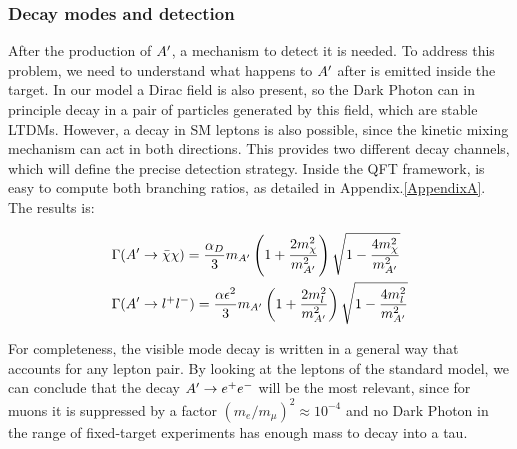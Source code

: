 \subsubsection{Decay modes and detection}
\label{ch1:sec:dm-decay}

After the production of $A'$, a mechanism to detect it is needed. To address this problem, we need to understand what happens to $A'$ after is emitted inside the target. In our model a Dirac field is also present, so the Dark Photon can in principle decay in a pair of particles generated by this field, which are stable LTDMs. However, a decay in SM leptons is also possible, since the kinetic mixing mechanism can act in both directions. This provides two different decay channels, which will define the precise detection strategy. Inside the QFT framework, is easy to compute both branching ratios, as detailed in Appendix.\ref{AppendixA}. The results is:

\begin{equation}
  \label{eq:dm-bratio}
  \begin{aligned}
    &\Gamma(A' \to \bar{\chi} \chi) = \frac{\alpha_D}{3} m_{A'} \left( 1 + \frac{2m^2_{\chi}}{m_{A'}^2}\right) \sqrt{1 - \frac{4m_{\chi}^2}{m^2_{A'}}}\\
    &\Gamma(A' \to l^+l^-) = \frac{\alpha \epsilon^2}{3} m_{A'} \left( 1 + \frac{2m^2_{l}}{m_{A'}^2}\right) \sqrt{1 - \frac{4m_{l}^2}{m^2_{A'}}}
  \end{aligned}
\end{equation}

For completeness, the visible mode decay is written in a general way that accounts for any lepton pair. By looking at the leptons of the standard model, we can conclude that the decay $A' \to e^+e^-$ will be the most relevant, since for muons it is suppressed by a factor $(m_e/m_{\mu})^2 \approx 10^{-4}$ and no Dark Photon in the range of fixed-target experiments has enough mass to decay into a tau.

